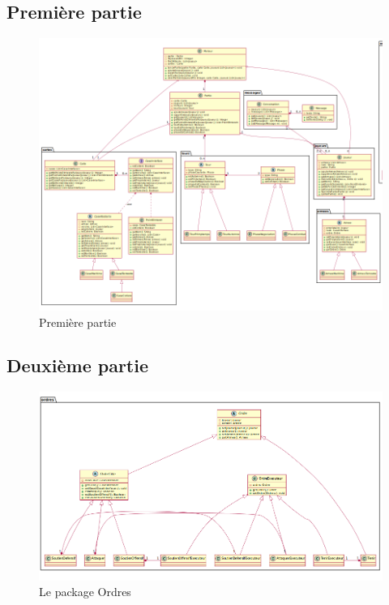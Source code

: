 	\subsection{Première partie}
		\vspace{10mm}
		\begin{figure}[!h]
			\centering
			\includegraphics[angle=90,width=150mm]{images/DP1.png}
			\caption{Première partie}
		\end{figure}

	\newpage

	\subsection{Deuxième partie}
		\vspace{10mm}
		\begin{figure}[!h]
			\centering
			\includegraphics[scale=0.4]{images/DP2.png}
			\caption{Le package Ordres}
		\end{figure}

